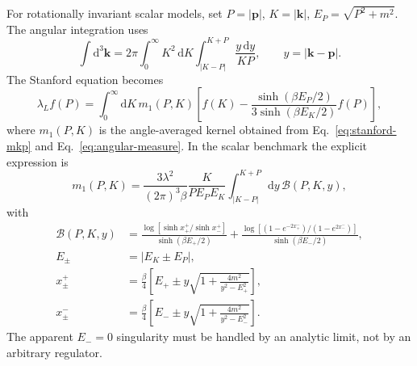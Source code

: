 \documentclass[11pt]{article}
\newcommand{\dd}{\mathrm{d}}
\begin{document}
For rotationally invariant scalar models, set \(P=|\mathbf p|\),
\(K=|\mathbf k|\), \(E_P=\sqrt{P^2+m^2}\). The angular integration uses
\begin{equation}
  \int\dd^3\mathbf k
  =
  2\pi\int_0^\infty K^2\,\dd K
  \int_{|K-P|}^{K+P}\frac{y\,\dd y}{KP},
  \qquad y=|\mathbf k-\mathbf p|.
  \label{eq:angular-measure}
\end{equation}
The Stanford equation becomes
\begin{equation}
  \lambda_L f(P)
  =
  \int_0^\infty \dd K\, m_1(P,K)
  \left[
    f(K)
    -
    \frac{\sinh(\beta E_P/2)}
         {3\sinh(\beta E_K/2)}
    f(P)
  \right],
  \label{eq:stanford-1d}
\end{equation}
where \(m_1(P,K)\) is the angle-averaged kernel obtained from
Eq.~\eqref{eq:stanford-mkp} and Eq.~\eqref{eq:angular-measure}. In the scalar
benchmark the explicit expression is
\begin{equation}
  m_1(P,K)
  =
  \frac{3\lambda^2}{(2\pi)^3\beta}
  \frac{K}{P E_P E_K}
  \int_{|K-P|}^{K+P}\dd y\,
  \mathcal B(P,K,y),
  \label{eq:m1}
\end{equation}
with
\begin{align}
  \mathcal B(P,K,y)
  &=
  \frac{
    \log\!\left[\sinh x^{+}_{+}/\sinh x^{+}_{-}\right]
  }
  {\sinh(\beta E_+/2)}
  +
  \frac{
    \log\!\left[(1-e^{-2x^{-}_{+}})/(1-e^{2x^{-}_{-}})\right]
  }
  {\sinh(\beta E_-/2)},                                    \\
  E_\pm &= |E_K\pm E_P|,                                    \\
  x^{+}_{\pm}
  &=
  \frac{\beta}{4}
  \left[
    E_+
    \pm y\sqrt{1+\frac{4m^2}{y^2-E_+^2}}
  \right],                                                   \\
  x^{-}_{\pm}
  &=
  \frac{\beta}{4}
  \left[
    E_-
    \pm y\sqrt{1+\frac{4m^2}{y^2-E_-^2}}
  \right].
  \label{eq:xpm-1d}
\end{align}
The apparent \(E_-=0\) singularity must be handled by an analytic limit, not by
an arbitrary regulator.
\end{document}
